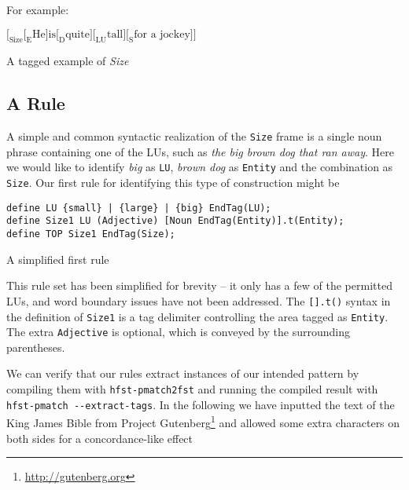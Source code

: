 \documentclass{llncs}
\begin{document}
For example:

\begin{table}[h]
\begin{center}
\begin{math}
\Big[_{\text{Size}}\Big[_{\text{E}}\text{He} \Big]
  \text{is} \Big[_{\text{D}} \text{quite} \Big] \Big[_{\text{LU}}\text{tall} \Big]
  \Big[_{\text{S}} \text{for a jockey} \Big] \Big]
\end{math}
\end{center}
\caption{A tagged example of \emph{Size}}
\end{table}

\subsection{A Rule}

A simple and common syntactic realization of the \verb+Size+ frame is a single
noun phrase containing one of the LUs, such as
\emph{the big brown dog that ran away}. Here we would like to identify \emph{big} as \verb+LU+,
\emph{brown dog} as \verb+Entity+ and the combination as \verb+Size+.
Our first rule for identifying this type of construction might be

\begin{table}[h]
\begin{center}
  \small
  \begin{framed}
\begin{verbatim}
define LU {small} | {large} | {big} EndTag(LU);
define Size1 LU (Adjective) [Noun EndTag(Entity)].t(Entity);
define TOP Size1 EndTag(Size);  
\end{verbatim}
\end{framed}
\normalsize
\caption{A simplified first rule}
\end{center}
\end{table}

\noindent This rule set has been simplified for brevity -- it only has a few of the
permitted LUs, and word boundary issues have not been addressed.
The \verb+[].t()+ syntax in the definition of \verb+Size1+ is a tag delimiter
controlling the area tagged as \verb+Entity+. The extra \verb+Adjective+ is
optional, which is conveyed by the surrounding parentheses.

\sloppy We can verify that our rules extract instances of our intended pattern by compiling
them with \verb+hfst-pmatch2fst+ and running the compiled result with
\verb+hfst-pmatch --extract-tags+. In the following we have
inputted the text of the King James Bible from Project
Gutenberg\footnote{\url{http://gutenberg.org}} and allowed some extra characters on both
sides for a concordance-like effect
\end{document}
